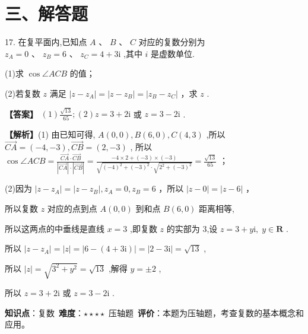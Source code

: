\documentclass[10pt]{article}
\begin{document}
\section*{三、解答题}

17. 在复平面内,已知点 \(A\text{ 、 }B\text{ 、 }C\) 对应的复数分别为 \({z}_{A} = 0\text{ 、 }{z}_{B} = 6\text{ 、 }{z}_{C} = 4 + 3\mathrm{i}\) ,其中 \(i\) 是虚数单位.

(1)求 \(\cos \angle {ACB}\) 的值；

(2)若复数 \(z\) 满足 \(\left| {z - {z}_{A}}\right|  = \left| {z - {z}_{B}}\right|  = \left| {{z}_{B} - {z}_{C}}\right|\) ，求 \(z\) .

\textbf{【答案】} \(\left( 1\right) \frac{\sqrt{13}}{65};\left( 2\right) z = 3 + 2\mathrm{i}\) 或 \(z = 3 - 2\mathrm{i}\) .

\textbf{【解析】}(1) 由已知可得, \(A\left( {0,0}\right) , B\left( {6,0}\right) , C\left( {4,3}\right)\) ,所以 \(\overrightarrow{CA} = \left( {-4, - 3}\right) ,\overrightarrow{CB} = \left( {2, - 3}\right)\) , 所以 \(\cos \angle {ACB} = \frac{\overrightarrow{CA} \cdot  \overrightarrow{CB}}{\left| \overrightarrow{CA}\right|  \cdot  \left| \overrightarrow{CB}\right| } = \frac{-4 \times  2 + \left( {-3}\right)  \times  \left( {-3}\right) }{\sqrt{{\left( -4\right) }^{2} + {\left( -3\right) }^{2}} \cdot  \sqrt{{2}^{2} + {\left( -3\right) }^{2}}} = \frac{\sqrt{13}}{65}\) ；

(2)因为 \(\left| {z - {z}_{A}}\right|  = \left| {z - {z}_{B}}\right| ,{z}_{A} = 0,{z}_{B} = 6\) ，所以 \(\left| {z - 0}\right|  = \left| {z - 6}\right|\) ，

所以复数 \(z\) 对应的点到点 \(A\left( {0,0}\right)\) 到和点 \(B\left( {6,0}\right)\) 距离相等,

所以这两点的中垂线是直线 \(x = 3\) ,即复数 \(z\) 的实部为 3,设 \(z = 3 + y\mathrm{i},\;y \in  \mathbf{R}\) .

所以 \(\left| {z - {z}_{A}}\right|  = \left| z\right|  = \left| {6 - \left( {4 + 3\mathrm{i}}\right) }\right|  = \left| {2 - 3\mathrm{i}}\right|  = \sqrt{13}\) ,

所以 \(\left| z\right|  = \sqrt{{3}^{2} + {y}^{2}} = \sqrt{13}\) ,解得 \(y =  \pm  2\) ,

所以 \(z = 3 + 2\mathrm{i}\) 或 \(z = 3 - 2\mathrm{i}\) .

\begin{analysisbox}[考点分析]
\textbf{知识点}：复数\
\textbf{难度}：$\star\star\star\star$ 压轴题\
\textbf{评价}：本题为压轴题，考查复数的基本概念和应用。
\end{analysisbox}
\end{document}
